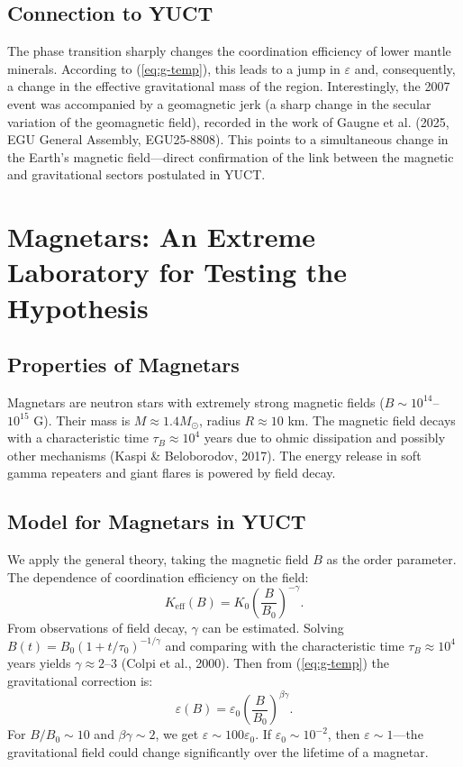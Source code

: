 \documentclass[12pt]{article}
\theoremstyle{remark}
\newcommand{\Keff}{K_{\mathrm{eff}}}
\newcommand{\eps}{\varepsilon}
\begin{document}
	\subsection{Connection to YUCT}
	\label{subsec:grace-yuct}
	
	The phase transition sharply changes the coordination efficiency of lower mantle minerals. According to (\ref{eq:g-temp}), this leads to a jump in $\eps$ and, consequently, a change in the effective gravitational mass of the region. Interestingly, the 2007 event was accompanied by a geomagnetic jerk (a sharp change in the secular variation of the geomagnetic field), recorded in the work of Gaugne et al. (2025, EGU General Assembly, EGU25-8808). This points to a simultaneous change in the Earth's magnetic field—direct confirmation of the link between the magnetic and gravitational sectors postulated in YUCT.
	
	\section{Magnetars: An Extreme Laboratory for Testing the Hypothesis}
	\label{sec:magnetars}
	
	\subsection{Properties of Magnetars}
	\label{subsec:magnetars-properties}
	
	Magnetars are neutron stars with extremely strong magnetic fields ($B \sim 10^{14}$–$10^{15}$ G). Their mass is $M \approx 1.4 M_\odot$, radius $R \approx 10$ km. The magnetic field decays with a characteristic time $\tau_B \approx 10^4$ years due to ohmic dissipation and possibly other mechanisms (Kaspi \& Beloborodov, 2017). The energy release in soft gamma repeaters and giant flares is powered by field decay.
	
	\subsection{Model for Magnetars in YUCT}
	\label{subsec:magnetars-model}
	
	We apply the general theory, taking the magnetic field $B$ as the order parameter. The dependence of coordination efficiency on the field:
	\begin{equation}
		\Keff(B) = K_0 \left( \frac{B}{B_0} \right)^{-\gamma}.
		\label{eq:keff-b}
	\end{equation}
	From observations of field decay, $\gamma$ can be estimated. Solving $B(t) = B_0 (1 + t/\tau_0)^{-1/\gamma}$ and comparing with the characteristic time $\tau_B \approx 10^4$ years yields $\gamma \approx 2$–$3$ (Colpi et al., 2000). Then from (\ref{eq:g-temp}) the gravitational correction is:
	\begin{equation}
		\eps(B) = \eps_0 \left( \frac{B}{B_0} \right)^{\beta\gamma}.
		\label{eq:eps-b}
	\end{equation}
	For $B/B_0 \sim 10$ and $\beta\gamma \sim 2$, we get $\eps \sim 100 \eps_0$. If $\eps_0 \sim 10^{-2}$, then $\eps \sim 1$—the gravitational field could change significantly over the lifetime of a magnetar.
	
\end{document}
